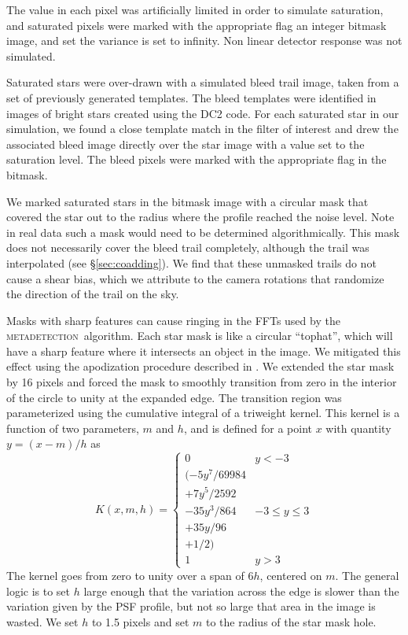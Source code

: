 \documentclass[iop, twocolappendix, appendixfloats, numberedappendix, apj]{hackemulateapj}
\newcommand{\mdet}{\textsc{metadetection}}
\begin{document}
The value in each pixel was artificially limited in order to simulate
saturation, and saturated pixels were marked with the appropriate flag an
integer bitmask image, and set the variance is set to infinity.  Non linear
detector response was not simulated.

Saturated stars were over-drawn with a simulated bleed trail image, taken from
a set of previously generated templates.  The bleed templates were identified
in images of bright stars created using the DC2 code.  For each saturated star
in our simulation, we found a close template match in the filter of interest
and drew the associated bleed image directly over the star image with a value
set to the saturation level. The bleed pixels were marked with the appropriate
flag in the bitmask.

We marked saturated stars in the bitmask image with a circular mask that
covered the star out to the radius where the profile reached the noise level.
Note in real data such a mask would need to be determined algorithmically.
This mask does not necessarily cover the bleed trail completely, although the
trail was interpolated (see \S \ref{sec:coadding}).  We find that these
unmasked trails do not cause a shear bias, which we attribute to the
camera rotations that randomize the direction of the trail on the sky.

Masks with sharp features can cause ringing in the FFTs used
by the \mdet\ algorithm.   Each star mask is like a circular ``tophat'',
which will have a sharp feature where it intersects an object in the image.  We
mitigated this effect using the apodization
procedure described in \citet{BeckerMdetCoadd}. We extended the star
mask by 16 pixels and forced the mask
to smoothly transition from zero in the interior of the circle
to unity at the expanded edge. The transition region was parameterized using the cumulative
integral of a triweight kernel. This kernel is a function of two parameters, $m$ and $h$,
and is defined for a point $x$ with quantity $y = (x-m)/h$ as
\begin{equation}
K(x, m, h) = \begin{cases}
0 & y < -3 \\
(-5y^7 / 69984 \\
+ 7y^5 / 2592 \\
- 35y^3 / 864 & -3 \le y \le 3 \\
+ 35y / 96 \\
+ 1 / 2) \\
1 & y > 3
\end{cases}
\end{equation}
The kernel goes from zero to unity over a span of $6h$, centered on $m$.
The general logic is to set $h$ large enough that the variation across the edge is slower
than the variation given by the PSF profile, but not so large that area in the image is
wasted. We set $h$ to 1.5 pixels and set $m$ to the radius of the star mask hole.
\end{document}
